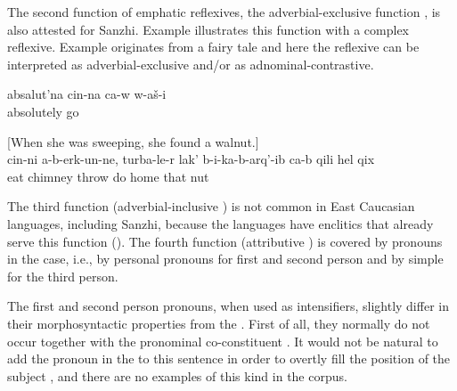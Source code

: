 	
The second function of emphatic reflexives, the adverbial-exclusive function , is also attested for Sanzhi. Example  illustrates this function with a complex  reflexive. Example  originates from a fairy tale and here the reflexive can be interpreted as adverbial-exclusive and/or as adnominal-contrastive.
%
\begin{exe}
	\ex	\label{ex:He went completely on his own (alone)@15c}
	\gll	absalut'na	cin-na	ca-w	w-aš-i\\
		absolutely			go\\
	\glt	{}
	
	\ex	\label{ex:‎‎She did not eat the nut herself, but threw it through the chimney into the house@3a} [When she was sweeping, she found a walnut.]\\
	\gll	cin-ni	a-b-erk-un-ne,	turba-le-r	lak' 	b-i-ka-b-arq'-ib	ca-b	qili	hel	qix\\
			eat	chimney	throw	do		home	that	nut\\
	\glt	{}
\end{exe}

The third function (adverbial-inclusive ) is not common in East Caucasian languages, including Sanzhi, because the languages have  enclitics that already serve this function (). The fourth function (attributive ) is covered by pronouns in the  case, i.e., by personal pronouns for first and second person and by simple  for the third person. 

The first and second person  pronouns, when used as intensifiers, slightly differ in their morphosyntactic properties from the . First of all, they normally do not occur together with the pronominal co-constituent . It would not be natural to add the pronoun in the  to this sentence in order to overtly fill the position of the  subject , and there are no examples of this kind in the corpus.
%


